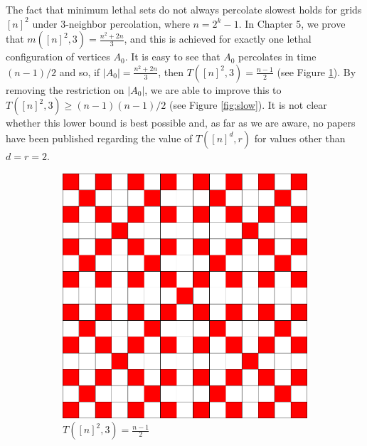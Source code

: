 The fact that minimum lethal sets do not always percolate slowest holds for grids $[n]^2$ under 3-neighbor percolation, where $n=2^k-1$. In Chapter 5, we prove that $m([n]^2,3) = \frac{n^2+2n}{3}$, and this is achieved for exactly one lethal configuration of vertices $A_0$. It is easy to see that $A_0$ percolates in time $(n-1)/2$ and so, if $|A_0| = \frac{n^2+2n}{3}$, then $T([n]^2,3) = \frac{n-1}{2}$ (see Figure \ref{fig:fast}). By removing the restriction on $|A_0|$, we are able to improve this to $T([n]^2,3) \geq (n-1)(n-1)/2$ (see Figure \ref{fig:slow}). It is not clear whether this lower bound is best possible and, as far as we are aware, no papers have been published regarding the value of $T([n]^d,r)$ for values other than $d=r=2$. 

\begin{figure}[]
\centering
\begin{subfigure}{0.4\textwidth}
	\includegraphics[width=\textwidth]{figures/1/15x15x1.pdf}
	\caption{$T([n]^2,3) = \frac{n-1}{2}$}
	\label{fig:fast}
\end{subfigure} \hfill%
\begin{subfigure}{0.4\textwidth}

\end{subfigure}
\end{figure}
